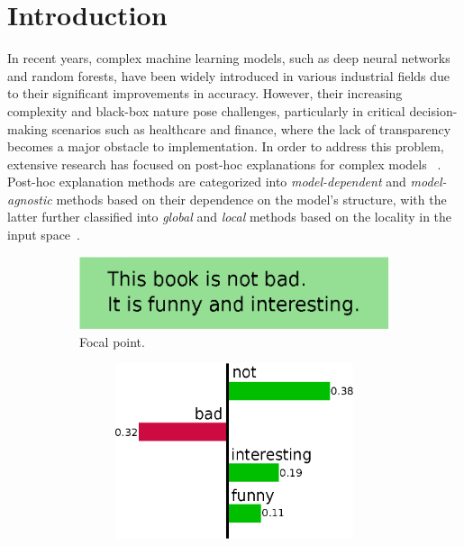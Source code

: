 \documentclass[runningheads]{llncs}
\begin{document}
{\section{Introduction}\label{sec:introduction}
In recent years,
complex machine learning models, such as deep neural networks and random forests,
have been widely introduced in various industrial fields
due to their significant improvements in accuracy.
However,
their increasing complexity and black-box nature pose challenges,
particularly in critical decision-making scenarios such as healthcare and finance,
where the lack of transparency becomes a major obstacle to implementation.
In order to address this problem,
extensive research has focused on post-hoc explanations for complex models
~\cite{guidotti2018local,ribeiro2016why,ribeiro2018anchors}.
Post-hoc explanation methods are categorized
into \emph{model-dependent} and \emph{model-agnostic} methods
based on their dependence on the model's structure,
with the latter further classified into \emph{global} and \emph{local} methods
based on the locality in the input space~\cite{samek2021explaining}.
\begin{figure}[tbp]
  \def\scale{0.38}
  \centering
  \begin{subfigure}[t]{0.55\textwidth}
    \centering
    \includegraphics[scale=\scale]{example-instance}
    \caption{Focal point.}\label{fig:example-instance}
    \vspace{0.5cm}
  \end{subfigure}
  \begin{subfigure}[t]{0.45\textwidth}
    \begin{subfigure}[t]{\textwidth}
      \centering
      \includegraphics[scale=\scale]{example-lime}

\end{subfigure}
\end{subfigure}
\end{figure}}
\end{document}
